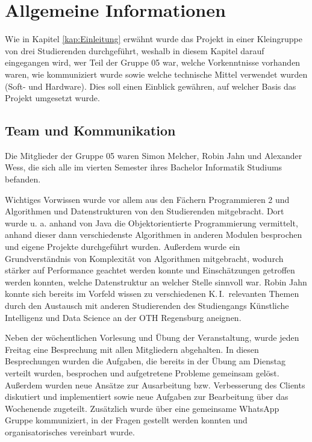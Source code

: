 \documentclass[12pt,a4paper,bibliography=totocnumbered,listof=totocnumbered]{article}
\begin{document}
\newpage
\section{Allgemeine Informationen}
Wie in Kapitel \ref{kap:Einleitung} erwähnt wurde das Projekt in einer Kleingruppe von drei Studierenden durchgeführt, weshalb in diesem Kapitel darauf eingegangen wird, wer Teil der Gruppe 05 war, welche Vorkenntnisse vorhanden waren, wie kommuniziert wurde sowie welche technische Mittel verwendet wurden (Soft- und Hardware). Dies soll einen Einblick gewähren, auf welcher Basis das Projekt umgesetzt wurde.

\subsection{Team und Kommunikation}
Die Mitglieder der Gruppe 05 waren Simon Melcher, Robin Jahn und Alexander Wess, die sich alle im vierten Semester ihres Bachelor Informatik Studiums befanden.

Wichtiges Vorwissen wurde vor allem aus den Fächern Programmieren 2 und Algorithmen und Datenstrukturen von den Studierenden mitgebracht. Dort wurde u. a. anhand von Java die Objektorientierte Programmierung vermittelt, anhand dieser dann verschiedenste Algorithmen in anderen Modulen besprochen und eigene Projekte durchgeführt wurden. Außerdem wurde ein Grundverständnis von Komplexität von Algorithmen mitgebracht, wodurch stärker auf Performance geachtet werden konnte und Einschätzungen getroffen werden konnten, welche Datenstruktur an welcher Stelle sinnvoll war. Robin Jahn konnte sich bereits im Vorfeld wissen zu verschiedenen K.\,I.\ relevanten Themen durch den Austausch mit anderen Studierenden des Studiengangs \glqq Künstliche Intelligenz und Data Science \grqq{} an der OTH Regensburg aneignen.

Neben der wöchentlichen Vorlesung und Übung der Veranstaltung, wurde jeden Freitag eine Besprechung mit allen Mitgliedern abgehalten. In diesen Besprechungen wurden die Aufgaben, die bereits in der Übung am Dienstag verteilt wurden, besprochen und aufgetretene Probleme gemeinsam gelöst. Außerdem wurden neue Ansätze zur Ausarbeitung bzw. Verbesserung des Clients diskutiert und implementiert sowie neue Aufgaben zur Bearbeitung über das Wochenende zugeteilt. Zusätzlich wurde über eine gemeinsame WhatsApp Gruppe kommuniziert, in der Fragen gestellt werden konnten und organisatorisches vereinbart wurde.
\end{document}

